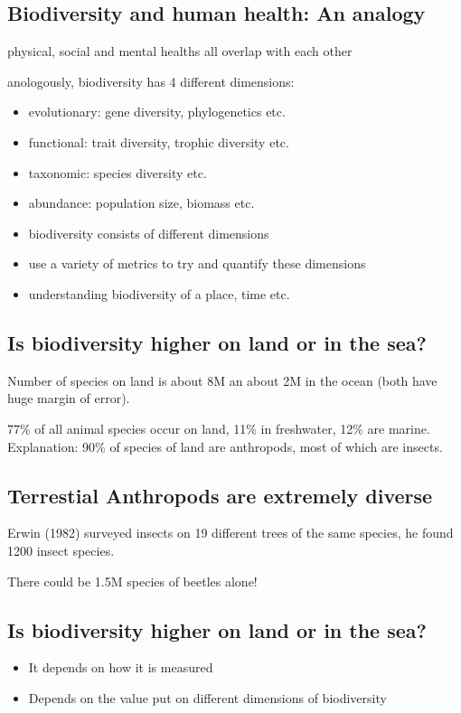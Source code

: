 \subsection{Biodiversity and human health: An analogy}

physical, social and mental healths all overlap with each other

anologously, biodiversity has 4 different dimensions:
\begin{itemize}
	\item evolutionary: gene diversity, phylogenetics etc.
	\item functional: trait diversity, trophic diversity etc.
	\item taxonomic: species diversity etc.
	\item abundance: population size, biomass etc.
\end{itemize}


\begin{itemize}
	\item biodiversity consists of different dimensions
	\item use a variety of metrics to try and quantify these dimensions
	\item understanding biodiversity of a place, time etc.
\end{itemize}

\subsection{Is biodiversity higher on land or in the sea?}

Number of species on land is about 8M an about 2M in the ocean (both have
huge margin of error).

77\% of all animal species occur on land, 11\% in freshwater, 12\% are marine.
Explanation: 90\% of species of land are anthropods, most of which are insects.

\subsection{Terrestial Anthropods are extremely diverse}

Erwin (1982) surveyed insects on 19 different trees of the same species, he
found 1200 insect species.

There could be 1.5M species of beetles alone!

\subsection{Is biodiversity higher on land or in the sea?}
\begin{itemize}
	\item It depends on how it is measured
	\item Depends on the value put on different dimensions of biodiversity
\end{itemize}

